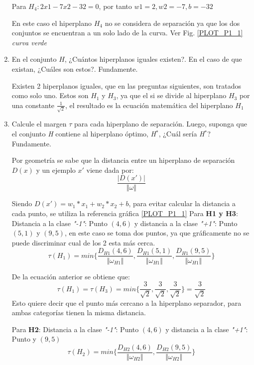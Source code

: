 \documentclass{article}
\begin{document}
\begin{enumerate}
    Para $H_4: 2x1 - 7x2 - 32 = 0$, por tanto $w1 = 2, w2 = -7, b = -32$

    En este caso el hiperplano $H_4$ no se considera de separación ya que los dos conjuntos se encuentran a un solo lado de la curva.
    Ver Fig. \ref{PLOT_P1_1} \textit{curva verde}

    \item En el conjunto $H$, ¿Cuántos hiperplanos iguales existen?. En el caso 
    de que existan, ¿Cuáles son estos?. Fundamente.

    Existen 2 hiperplanos iguales, que en las preguntas siguientes, son tratados como solo uno. Estos son $H_1$ y $H_3$, ya que
    el si se divide al hiperplano $H_3$ por una constante $\frac{1}{\sqrt{2}}$, el resultado es la ecuación matemática del 
    hiperplano $H_1$

    \item Calcule el margen $\tau$ para cada hiperplano de separación. Luego, suponga que el conjunto \textit{H}
    contiene al hiperplano óptimo, \textit{H}$^*$, ¿Cuál sería \textit{H}$^*$? Fundamente.

    Por geometría se sabe que la distancia entre un hiperplano de separación $D(x)$ y un
    ejemplo $x'$ viene dada por:
    \[
        \frac{\rvert D(x') \rvert}{\Vert \omega \Vert}   
    \]

    Siendo $D(x') = w_1*x_1 + w_2*x_2 + b$, para evitar calcular la distancia a cada punto, se utiliza la referencia gráfica \ref{PLOT_P1_1}
    Para \textbf{H1 y H3}:
    Distancia a la clase \textit{"-1"}: Punto $(4,6)$ y distancia a la clase \textit{"+1"}: Punto $(5, 1)$ y $(9, 5)$, en este caso
    se toma dos puntos, ya que gráficamente no se puede discriminar cual de los 2 esta más cerca.
    \[
        \tau(H_1) = min\{\frac{D_{H1}(4,6)}{\Vert \omega_{H1}\Vert}, \frac{D_{H1}(5,1)}{\Vert \omega_{H1}\Vert}, \frac{D_{H1}(9, 5)}{\Vert \omega_{H1}\Vert} \}    
    \]

    De la ecuación anterior se obtiene que:
    \[
        \tau(H_1) = \tau(H_3) = min\{\frac{3}{\sqrt{2}},\frac{3}{\sqrt{2}}, \frac{3}{\sqrt{2}}\} = \frac{3}{\sqrt{2}}
    \]
    Esto quiere decir que el punto más cercano a la hiperplano separador, para ambas categorías tienen la misma distancia.

    Para \textbf{H2}: 
    Distancia a la clase \textit{"-1"}: Punto $(4,6)$ y distancia a la clase \textit{"+1"}: Punto  y $(9, 5)$
    \[
        \tau(H_2) = min\{\frac{D_{H2}(4,6)}{\Vert \omega_{H2}\Vert}, \frac{D_{H2}(9, 5)}{\Vert \omega_{H2}\Vert} \}    
    \]


\end{enumerate}
\end{document}
